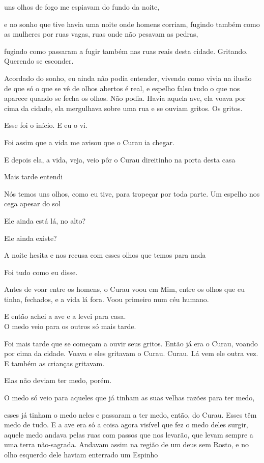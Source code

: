 uns olhos de fogo me espiavam do fundo da noite,

e no sonho que tive havia uma noite onde homens corriam, fugindo também
como as mulheres por ruas vagas, ruas onde não pesavam as pedras,

fugindo como passaram a fugir também nas ruas reais desta cidade.
Gritando. Querendo se esconder.

Acordado do sonho, eu ainda não podia entender, vivendo como vivia na
ilusão de que só o que se vê de olhos abertos é real, e espelho falso
tudo o que nos aparece quando se fecha os olhos. Não podia. Havia aquela
ave, ela voava por cima da cidade, ela mergulhava sobre uma rua e se
ouviam gritos. Os gritos.

Esse foi o início. E eu o vi.

Foi assim que a vida me avisou que o Curau ia chegar.

E depois ela, a vida, veja, veio pôr o Curau direitinho na porta desta
casa

Mais tarde entendi

Nós temos uns olhos, como eu tive, para tropeçar por toda parte. Um
espelho nos cega apesar do sol

Ele ainda está lá, no alto?

Ele ainda existe?

A noite hesita e nos recusa com esses olhos que temos para nada

Foi tudo como eu disse.

Antes de voar entre os homens, o Curau voou em Mim, entre os olhos que
eu tinha, fechados, e a vida lá fora. Voou primeiro num céu humano.

E então achei a ave e a levei para casa.\\

O medo veio para os outros só mais tarde.

Foi mais tarde que se começam a ouvir seus gritos. Então já era o Curau,
voando por cima da cidade. Voava e eles gritavam o Curau. Curau. Lá vem
ele outra vez. E também as crianças gritavam.

Elas não deviam ter medo, porém.

O medo só veio para aqueles que já tinham as suas velhas razões para ter
medo,

esses já tinham o medo neles e passaram a ter medo, então, do Curau.
Esses têm medo de tudo. E a ave era só a coisa agora visível que fez o
medo deles surgir, aquele medo andava pelas ruas com passos que nos
levarão, que levam sempre a uma terra não-sagrada. Andavam assim na
região de um deus sem Rosto, e no olho esquerdo dele haviam enterrado um
Espinho

